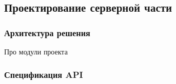 \subsection{Проектирование серверной части}

\subsubsection{Архитектура решения}

Про модули проекта

\subsubsection{Спецификация API}


